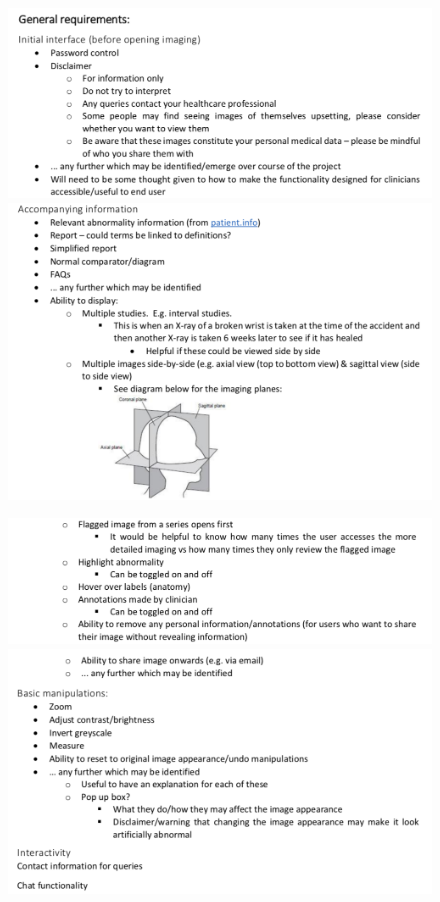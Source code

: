 \documentclass[12pt,twoside]{article}
\begin{document}
\begin{figure}[ht]
\centering
\includegraphics[width = 0.95\hsize]{./figures/GeneralSpec1}
\includegraphics[width = 0.95\hsize]{./figures/GeneralSpec2}
\end{figure}



\clearpage

\begin{figure}[ht]
\centering
\includegraphics[width = 0.95\hsize]{./figures/GeneralSpec3}
\includegraphics[width = 0.95\hsize]{./figures/GeneralSpec4}
\end{figure}
\end{document}

